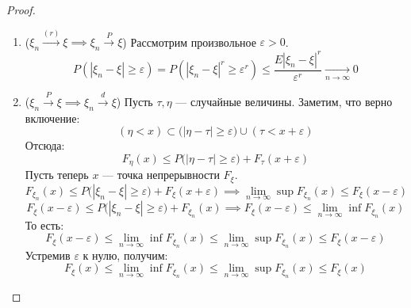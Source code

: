 \documentclass[11pt,openany,a4paper]{scrartcl}
\theoremstyle{plain}
\theoremstyle{definition}
\newcommand{\underto}[1]{\xrightarrow[#1]{}}
\newcommand{\overto}[1]{\xrightarrow{#1}}
\begin{document}
\begin{proof}
\mbox{}
    \begin{enumerate}
        \item
        ($\xi_n \overto{(r)} \xi \implies \xi_n \overto{P} \xi$)
        Рассмотрим произвольное $\varepsilon > 0$.
        $$
        P(|\xi_n - \xi| \geqslant \varepsilon) =
        P(|\xi_n - \xi|^r \geqslant \varepsilon^r) \leqslant
        \frac{E|\xi_n - \xi|^r}{\varepsilon^r} \underto{n \to \infty} 0
        $$
        \item
        ($\xi_n \overto{P} \xi \implies \xi_n \overto{d} \xi$)
        Пусть $\tau, \eta$ — случайные величины. Заметим, что верно включение:
        $$
        (\eta < x) \subset \big(|\eta - \tau| \geqslant \varepsilon\big) \cup
        (\tau < x + \varepsilon )
        $$
        Отсюда:
        $$
        F_\eta(x) \leqslant P\big(|\eta - \tau| \geqslant \varepsilon\big) +
        F_\tau(x + \varepsilon)
        $$
        Пусть теперь $x$ — точка непрерывности $F_\xi$.
        $$
        F_{\xi_n}(x) \leqslant P\big(|\xi_n - \xi| \geqslant \varepsilon\big) +
        F_\xi(x + \varepsilon) \implies
        \lim\limits_{n \to \infty} \sup F_{\xi_n}(x) \leqslant
        F_\xi(x - \varepsilon)
        $$
        $$
        F_\xi(x - \varepsilon) \leqslant P\big(|\xi_n - \xi| \geqslant \varepsilon\big) +
        F_{\xi_n}(x) \implies
        F_\xi(x - \varepsilon) \leqslant
        \lim\limits_{n \to \infty} \inf F_{\xi_n}(x)
        $$
        То есть:
        $$
        F_\xi(x - \varepsilon) \leqslant
        \lim\limits_{n \to \infty} \inf F_{\xi_n}(x) \leqslant
        \lim\limits_{n \to \infty} \sup F_{\xi_n}(x) \leqslant
        F_\xi(x - \varepsilon)
        $$
        Устремив $\varepsilon$ к нулю, получим:
        $$
        F_\xi(x) \leqslant
        \lim\limits_{n \to \infty} \inf F_{\xi_n}(x) \leqslant
        \lim\limits_{n \to \infty} \sup F_{\xi_n}(x) \leqslant
        F_\xi(x)
        $$
        

\end{enumerate}
\end{proof}
\end{document}
